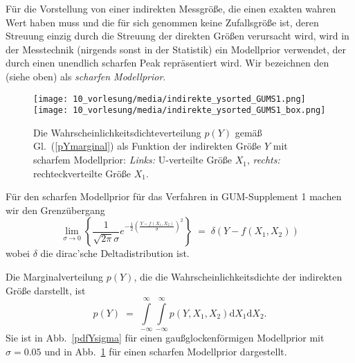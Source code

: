 Für die Vorstellung von einer indirekten Messgröße, die einen exakten wahren Wert haben muss und
die für sich genommen keine Zufallsgröße ist, deren Streuung einzig durch die Streuung der direkten
Größen verursacht wird, wird in der Messtechnik (nirgends sonst in der Statistik) ein
Modellprior verwendet, der durch einen unendlich scharfen Peak repräsentiert wird.
Wir bezeichnen den (siehe oben) als \textsl{scharfen Modellprior}.

\begin{figure}
	\begin{center}
		\texttt{[image: 10\_vorlesung/media/indirekte\_ysorted\_GUMS1.png]}
		\hspace{2mm}
		\texttt{[image: 10\_vorlesung/media/indirekte\_ysorted\_GUMS1\_box.png]}
		\caption{Die Wahrscheinlichkeitsdichteverteilung $p(Y)$ gemäß Gl.~(\ref{pYmarginal}) als Funktion der
			indirekten Größe $Y$ mit scharfem Modellprior:
			\textsl{Links:} U-verteilte Größe $X_1$,
			\textsl{rechts:} rechteckverteilte Größe $X_1$.}
		\label{pdfYscharf}
	\end{center}
\end{figure}

Für den scharfen Modellprior für das Verfahren in GUM-Supplement 1 machen wir den Grenzübergang
\begin{equation}
\lim_{\sigma \rightarrow 0} \left\{
\frac{1}{\sqrt{2\pi} \sigma} e^{-\frac{1}{2}\left(\frac{Y - f(X_1, X_2)}{\sigma}\right)^2}
\right\} \; = \; \delta(Y - f(X_1, X_2))
\end{equation}
wobei $\delta$ die dirac'sche Deltadistribution ist.

Die Marginalverteilung $p(Y)$, die die Wahrscheinlichkeitsdichte der indirekten Größe darstellt, ist
\begin{equation}
p(Y) \; = \;  \int\limits_{-\infty}^{\infty}
\int\limits_{-\infty}^{\infty} p(Y,X_1,X_2) \mathrm{d}X_1 \mathrm{d}X_2 .
\label{pYmarginal}
\end{equation}
Sie ist in Abb.~\ref{pdfYsigma} für einen gaußglockenförmigen Modellprior mit $\sigma = 0.05$ und in
Abb.~\ref{pdfYscharf} für einen scharfen Modellprior dargestellt.

